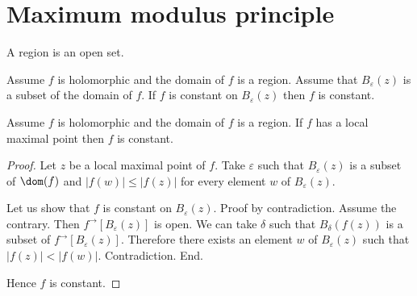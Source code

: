 \documentclass{article}
\newcommand{\Ball}[2]{B_{#1}(#2)}
\newcommand{\image}[2]{#1^{\to}[#2]}
\begin{document}
    \section{Maximum modulus principle}

  \begin{forthel}
    \begin{signature}
      A region is an open set.
    \end{signature}

    \begin{axiom}
      Assume $f$ is holomorphic and the domain of $f$ is a region.
      Assume that $\Ball{\varepsilon}{z}$ is a subset of the domain of $f$.
      If $f$ is constant on $\Ball{\varepsilon}{z}$ then $f$ is constant.
    \end{axiom}

    \begin{proposition}
      Assume $f$ is holomorphic and the domain of $f$ is a region.
      If $f$ has a local maximal point then $f$ is constant.
    \end{proposition}
    \begin{proof}
      Let $z$ be a local maximal point of $f$.
      Take $\varepsilon$ such that
        $\Ball{\varepsilon}{z}$ is a subset of $\dom(f)$
        and $|f(w)| \leq |f(z)|$ for every element $w$ of $\Ball{\varepsilon}{z}$.

      Let us show that $f$ is constant on $\Ball{\varepsilon}{z}$.
      Proof by contradiction.
        Assume the contrary.
        Then $\image{f}{\Ball{\varepsilon}{z}}$ is open.
        We can take $\delta$ such that
          $\Ball{\delta}{f(z)}$ is a subset of $\image{f}{\Ball{\varepsilon}{z}}$.
        Therefore there exists an element $w$ of $\Ball{\varepsilon}{z}$ such that
          $|f(z)| < |f(w)|$. Contradiction.
    	End.

      Hence $f$ is constant.
    \end{proof}
  \end{forthel}
\end{document}
